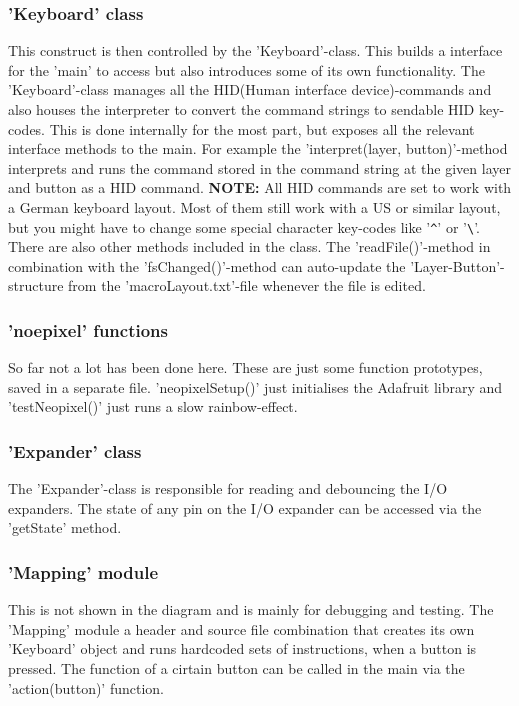 \documentclass[english, 12pt]{scrartcl}
\begin{document}
	\subsubsection{'Keyboard' class}
	This construct is then controlled by the 'Keyboard'-class. This builds a interface for the 'main' to access but also introduces some of its own functionality. The 'Keyboard'-class manages all the HID(Human interface device)-commands and also houses the interpreter to convert the command strings to sendable HID key-codes. This is done internally for the most part, but exposes all the relevant interface methods to the main. For example the 'interpret(layer, button)'-method interprets and runs the command stored in the command string at the given layer and button as a HID command.\newline
	\textbf{NOTE:} All HID commands are set to work with a German keyboard layout. Most of them still work with a US or similar layout, but you might have to change some special character key-codes like '\verb=^=' or '\verb=\='.\newline
	There are also other methods included in the class. The 'readFile()'-method in combination with the 'fsChanged()'-method can auto-update the 'Layer-Button'-structure from the 'macroLayout.txt'-file whenever the file is edited.
	\subsubsection{'noepixel' functions}
	So far not a lot has been done here. These are just some function prototypes, saved in a separate file. 'neopixelSetup()' just initialises the Adafruit library and 'testNeopixel()' just runs a slow rainbow-effect.
	\subsubsection{'Expander' class}
	The 'Expander'-class is responsible for reading and debouncing the I/O expanders. The state of any pin on the I/O expander can be accessed via the 'getState' method.
	\subsubsection{'Mapping' module}
	This is not shown in the diagram and is mainly for debugging and testing. The 'Mapping' module a header and source file combination that creates its own 'Keyboard' object and runs hardcoded sets of instructions, when a button is pressed. The function of a cirtain button can be called in the main via the 'action(button)' function.
\end{document}
